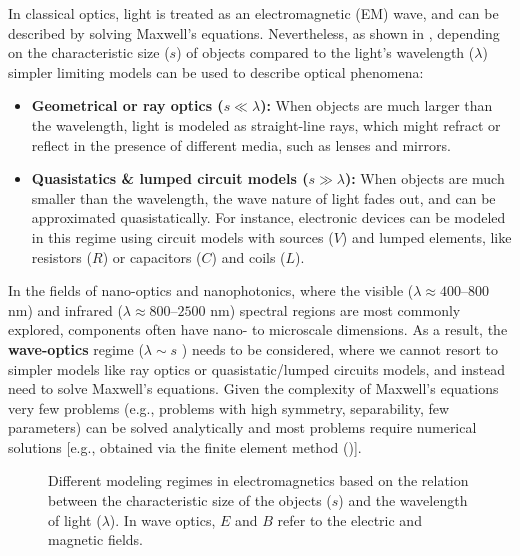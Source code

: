 In classical optics, light is treated as an electromagnetic (EM) wave, and can
be described by
solving Maxwell's equations. Nevertheless, as shown in ,
depending on the characteristic size ($s$) of objects compared to the light's
wavelength ($\lambda$)
simpler limiting models can be used to describe optical phenomena:
\begin{itemize}
    \item \textbf{Geometrical or ray optics ($s \ll \lambda$):} When objects
          are much larger than the wavelength, light is modeled as straight-line rays,
          which might refract or reflect in the presence of different media, such as
          lenses and mirrors.
    \item \textbf{Quasistatics \& lumped circuit models ($s \gg \lambda$):}
          When objects are much smaller than the wavelength, the wave nature of light
          fades out,
          and can be approximated quasistatically. For instance, electronic devices
          can be modeled in this regime using circuit models with sources ($V$) and lumped elements, 
          like resistors ($R$) or capacitors ($C$) and coils ($L$).
\end{itemize}
In the fields of nano-optics and nanophotonics, where the visible
(\(\lambda \approx 400\)--\(800\) nm) and infrared (\(\lambda \approx 800\)--\(2500\)
nm)
spectral regions are most commonly explored, components often have nano- to
microscale dimensions. As a result, the \textbf{wave-optics} regime ($\lambda
    \sim s$ ) needs to be considered,
where we cannot resort to simpler models like ray optics or
quasistatic/lumped circuits models,
and instead need to solve Maxwell's equations. Given the complexity of
Maxwell's
equations very few problems (e.g., problems with high symmetry, separability,
few parameters)
can be solved analytically and most problems require
numerical solutions [e.g., obtained via the finite element method ()].

\begin{figure}[tb]
    \centering

    \caption{Different modeling regimes in electromagnetics based on the
        relation between the characteristic size of the objects ($s$) and the
        wavelength of light ($\lambda$). In wave optics, $E$ and $B$ refer to
        the electric and magnetic fields.}
    \label{fig:EM_regime}
\end{figure}

